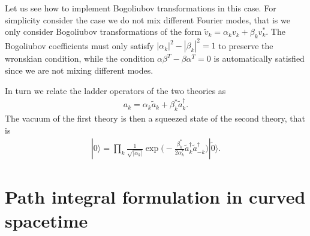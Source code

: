 \documentclass[../QFT_main.tex]{subfiles}
\begin{document}
Let us see how to implement Bogoliubov transformations in this case.
For simplicity consider the case we do not mix different Fourier modes, that is we only consider Bogoliubov transformations of the form $\tilde{v}_k = \alpha_k v_k + \beta_k v_k^*$.
The Bogoliubov coefficients must only satisfy $|\alpha_k|^2 - |\beta_k|^2 = 1$ to preserve the wronskian condition, while the condition $\alpha\beta^T-\beta\alpha^T=0$ is automatically satisfied since we are not mixing different modes.

In turn we relate the ladder operators of the two theories as
\begin{align}
    a_k = \alpha_k \tilde{a}_k + \beta_k^* \tilde{a}_k^\dagger.
\end{align}
The vacuum of the first theory is then a squeezed state of the second theory, that is
\begin{align}
    |0\rangle = \prod_k \frac{1}{\sqrt{|\alpha_k|}} \exp\Big(-\frac{\beta_k^*}{2\alpha_k^*} \tilde{a}_k^\dagger \tilde{a}_{-k}^\dagger\Big) |\tilde{0}\rangle.
\end{align}





\section{Path integral formulation in curved spacetime}
\end{document}
